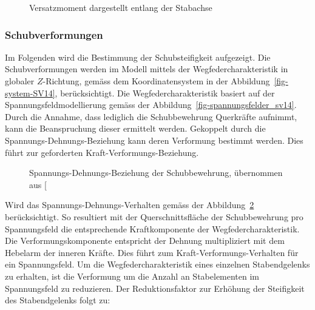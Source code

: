 \documentclass[
  11pt,
  letterpaper,
]{scrreprt}
\begin{document}
\begin{figure}[H]


\caption{\label{fig-versatzmoment_sv14}Versatzmoment dargestellt entlang
der Stabachse}

\end{figure}%

\subsubsection{Schubverformungen}\label{schubverformungen-1}

Im Folgenden wird die Bestimmung der Schubsteifigkeit aufgezeigt. Die
Schubverformungen werden im Modell mittels der Wegfedercharakteristik in
globaler \(Z\)-Richtung, gemäss dem Koordinatensystem in der
Abbildung~\ref{fig-system-SV14}, berücksichtigt. Die
Wegfedercharakteristik basiert auf der Spannungsfeldmodellierung gemäss
der Abbildung~\ref{fig-spannungsfelder_sv14}. Durch die Annahme, dass
lediglich die Schubbewehrung Querkräfte aufnimmt, kann die Beanspruchung
dieser ermittelt werden. Gekoppelt durch die
Spannungs-Dehnungs-Beziehung kann deren Verformung bestimmt werden. Dies
führt zur geforderten Kraft-Verformungs-Beziehung.

\begin{figure}[H]


\caption{\label{fig-sigma-epsilon-sv14}Spannungs-Dehnungs-Beziehung der
Schubbewehrung, übernommen aus
{[}\citeproc{ref-gitz_ansatze_2024}{1}{]}}

\end{figure}%

Wird das Spannungs-Dehnungs-Verhalten gemäss der
Abbildung~\ref{fig-sigma-epsilon-sv14} berücksichtigt. So resultiert mit
der Querschnittsfläche der Schubbewehrung pro Spannungsfeld die
entsprechende Kraftkomponente der Wegfedercharakteristik. Die
Verformungskomponente entspricht der Dehnung multipliziert mit dem
Hebelarm der inneren Kräfte. Dies führt zum Kraft-Verformungs-Verhalten
für ein Spannungsfeld. Um die Wegfedercharakteristik eines einzelnen
Stabendgelenks zu erhalten, ist die Verformung um die Anzahl an
Stabelementen im Spannungsfeld zu reduzieren. Der Reduktionsfaktor zur
Erhöhung der Steifigkeit des Stabendgelenks folgt zu:
\end{document}
